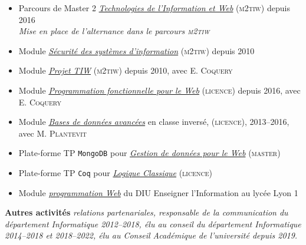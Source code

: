 \documentclass[12pt,a4paper]{article}
\newcommand{\activite}[1]{\textbf{#1}\xspace}
\newcommand{\comment}[1]{\textsl{#1}\xspace}
\newcommand{\ECO}{E. \textsc{Coquery}\xspace}
\newcommand{\MPL}{M. \textsc{Plantevit}\xspace}
\newcommand{\TIW}{\textsc{m2tiw}\xspace}
\newcommand{\MIF}{\textsc{master}\xspace}
\newcommand{\LIC}{\textsc{licence}\xspace}
\begin{document}
  \begin{itemize}
    \item Parcours de Master 2 \href{http://master-info.univ-lyon1.fr/TIW/}{\emph{Technologies de l'Information et Web}} (\TIW) depuis 2016\\
     \comment{Mise en place de l'alternance dans le parcours  \TIW}

    \item Module \href{https://perso.liris.cnrs.fr/rthion/dokuwiki/enseignement:tiw4}{\emph{Sécurité des systèmes d'information}} (\TIW) depuis 2010
    
    \item Module \href{https://perso.liris.cnrs.fr/rthion/dokuwiki/enseignement:tiw5}{\emph{Projet TIW}} (\TIW) depuis 2010, avec \ECO

    \item Module \href{https://perso.liris.cnrs.fr/rthion/dokuwiki/enseignement:lifap5:start}{\emph{Programmation fonctionnelle pour le Web}} (\LIC) depuis 2016, avec \ECO
    
    \item Module \href{https://www.youtube.com/channel/UCp6q0_DxUdNXhoc2Oue1w9g/}{\emph{Bases de données avancées}} en classe inversé, (\LIC), 2013--2016, avec \MPL

    \item {Plate-forme TP \texttt{MongoDB}} pour  \href{https://perso.liris.cnrs.fr/romuald.thion/files/Enseignement/MIF04/}{\emph{Gestion de données pour le Web}} (\MIF)
    
    \item Plate-forme TP \texttt{Coq} pour  \href{https://perso.liris.cnrs.fr/ecoquery/dokuwiki/doku.php?id=enseignement:logique:start}{\emph{Logique Classique}} (\LIC)
    
    \item Module \href{https://gonnord.gitlabpages.inria.fr/diu-lyon/bloc1/WEB/README-slides.html}{\emph{programmation Web}} du DIU Enseigner l'Information au lycée Lyon 1

  \end{itemize}

\activite{Autres activités} \comment{relations partenariales, responsable de la communication du département Informatique 2012--2018, élu au conseil du département Informatique 2014--2018 et 2018--2022, élu au Conseil Académique de l'université depuis 2019.}

\end{document}
